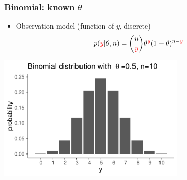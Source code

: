 \documentclass[10pt,handout]{beamer}
\begin{document}
\begin{frame}
  \frametitle{Binomial: known $\theta$}

  \begin{itemize}
  \item {\color{blue}Observation model} (function of {\color{red} $y$}, discrete)
    \begin{align*}
      p({\color{red}y}|\theta,n) = \binom{n}{{\color{red}y}} \theta^{\color{red}y}(1-\theta)^{n-{\color{red}y}}
    \end{align*}
  \end{itemize}

  \begin{center}
    {\includegraphics[width=9cm]{figs/dbinom10.pdf}\\
      \vspace{-0.6\baselineskip}
}
\end{center}
\end{frame}
\end{document}
